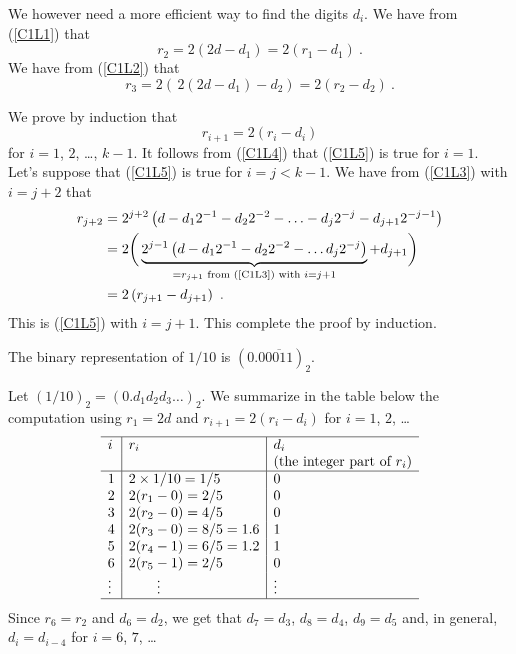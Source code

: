 We however need a more efficient way to find the digits $d_i$.  We
have from (\ref{C1L1}) that
\begin{equation} \label{C1L4}
  r_2 = 2 (2d - d_1) = 2(r_1 - d_1)\ .
\end{equation}
We have from (\ref{C1L2}) that
\[
r_3 = 2 (\, 2 (2 d - d_1) - d_2 ) = 2 ( r_2 - d_2) \  .
\]

We prove by induction that
\begin{equation} \label{C1L5}
  r_{i+1} = 2 (r_i - d_i )
\end{equation}
for $i=1$, $2$, \ldots, $k-1$.  It follows from (\ref{C1L4}) that
(\ref{C1L5}) is true for $i=1$.  Let's suppose that
(\ref{C1L5}) is true for $i=j<k-1$.  We have from (\ref{C1L3})
with $i=j+2$ that
\begin{align*}
r_{j+2} &= 2^{j+2}\left( d - d_1 2^{-1} - d_2 2^{-2} - \ldots
- d_j 2^{-j} - d_{j+1} 2^{-j-1}\right) \\
&= 2 \bigg( \underbrace{ 2^{j-1} \left( d - d_1 2^{-1} - d_2 2^{-2} - \ldots
d_j 2^{-j}\right)}_{=r_{j+1}\text{ from (\ref{C1L3}) with } i=j+1}
  + d_{j+1} \bigg) \\
&= 2 \left( r_{j+1} - d_{j+1}\right) \ .
\end{align*}
This is (\ref{C1L5}) with $i=j+1$.  This complete the proof by
induction.

\begin{egg}
The binary representation of $1/10$ is $(0.0\overline{0011})_2$.

Let $(1/10)_2 = (0.d_1 d_2 d_3 \ldots)_2$.  We summarize in the
table below the computation using $r_1 = 2 d$ and
$r_{i+1} = 2 (r_i - d_i )$ for $i=1$, $2$, \ldots
\[
\begin{array}{l|l|l}
\hline
i & r_ i & d_i \\
 & & \text{(the integer part of $r_i$)} \\
\hline
1 & 2 \times 1/10 = 1/5 & 0 \\
2 & 2 (r_1 - 0) = 2/5 & 0 \\
3 & 2 (r_2 - 0) = 4/5 & 0 \\
4 & 2 (r_3 - 0) = 8/5 = 1.6 & 1 \\
5 & 2 (r_4 - 1) = 6/5 = 1.2 & 1 \\
6 & 2 (r_5 - 1) = 2/5 & 0 \\
\vdots & \qquad \vdots & \vdots \\
\hline
\end{array}
\]
Since $r_6 = r_2$ and $d_6 = d_2$, we get that $d_7 = d_3$,
$d_8=d_4$, $d_9 = d_5$ and, in general, $d_i= d_{i-4}$ for $i=6$, $7$,
\ldots
\end{egg}

